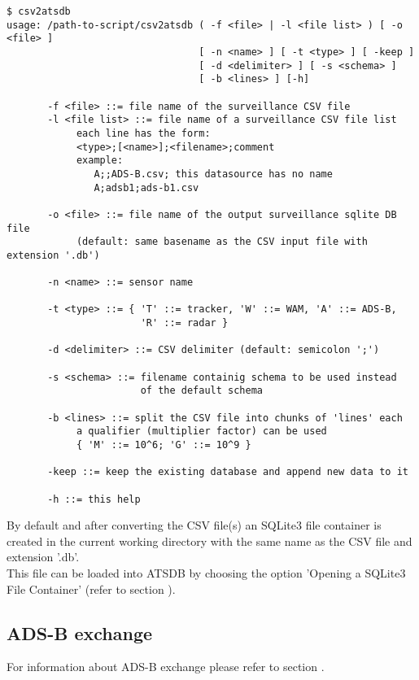 \begin{verbatim}
$ csv2atsdb
usage: /path-to-script/csv2atsdb ( -f <file> | -l <file list> ) [ -o <file> ]
                                 [ -n <name> ] [ -t <type> ] [ -keep ]
                                 [ -d <delimiter> ] [ -s <schema> ] 
                                 [ -b <lines> ] [-h]

       -f <file> ::= file name of the surveillance CSV file
       -l <file list> ::= file name of a surveillance CSV file list
            each line has the form:
            <type>;[<name>];<filename>;comment
            example:
               A;;ADS-B.csv; this datasource has no name
               A;adsb1;ads-b1.csv

       -o <file> ::= file name of the output surveillance sqlite DB file
            (default: same basename as the CSV input file with extension '.db')

       -n <name> ::= sensor name

       -t <type> ::= { 'T' ::= tracker, 'W' ::= WAM, 'A' ::= ADS-B, 
                       'R' ::= radar }

       -d <delimiter> ::= CSV delimiter (default: semicolon ';')

       -s <schema> ::= filename containig schema to be used instead
                       of the default schema

       -b <lines> ::= split the CSV file into chunks of 'lines' each
            a qualifier (multiplier factor) can be used
            { 'M' ::= 10^6; 'G' ::= 10^9 }

       -keep ::= keep the existing database and append new data to it

       -h ::= this help
\end{verbatim}

By default and after converting the CSV file(s) an SQLite3 file container is created in the current working directory with the same name as the CSV file and extension '.db'. \\

This file can be loaded into ATSDB by choosing the option 'Opening a SQLite3 File Container' (refer to section ).

\subsection{ADS-B exchange}

For information about ADS-B exchange please refer to section . \\

